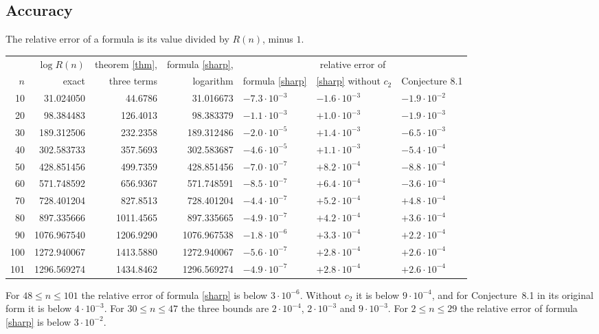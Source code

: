 \documentclass[10pt]{article}
\begin{document}
\subsection*{Accuracy}
The relative error of a formula is its value divided by $R(n)$, minus $1$.
\begin{center}
\small
\begin{tabular}{rrrrlll}
\toprule
 & $\log R(n)$ & theorem \eqref{thm}, & formula \eqref{sharp}, & \multicolumn{3}{c}{relative error of}\\
$n$ & exact & three terms & logarithm & formula \eqref{sharp} & \eqref{sharp} without $c_2$ & Conjecture 8.1\\
\midrule
10 & 31.024050 & 44.6786 & 31.016673 & $-7.3\cdot10^{-3}$ & $-1.6\cdot10^{-3}$ & $-1.9\cdot10^{-2}$\\
20 & 98.384483 & 126.4013 & 98.383379 & $-1.1\cdot10^{-3}$ & $+1.0\cdot10^{-3}$ & $-1.9\cdot10^{-3}$\\
30 & 189.312506 & 232.2358 & 189.312486 & $-2.0\cdot10^{-5}$ & $+1.4\cdot10^{-3}$ & $-6.5\cdot10^{-3}$\\
40 & 302.583733 & 357.5693 & 302.583687 & $-4.6\cdot10^{-5}$ & $+1.1\cdot10^{-3}$ & $-5.4\cdot10^{-4}$\\
50 & 428.851456 & 499.7359 & 428.851456 & $-7.0\cdot10^{-7}$ & $+8.2\cdot10^{-4}$ & $-8.8\cdot10^{-4}$\\
60 & 571.748592 & 656.9367 & 571.748591 & $-8.5\cdot10^{-7}$ & $+6.4\cdot10^{-4}$ & $-3.6\cdot10^{-4}$\\
70 & 728.401204 & 827.8513 & 728.401204 & $-4.4\cdot10^{-7}$ & $+5.2\cdot10^{-4}$ & $+4.8\cdot10^{-4}$\\
80 & 897.335666 & 1011.4565 & 897.335665 & $-4.9\cdot10^{-7}$ & $+4.2\cdot10^{-4}$ & $+3.6\cdot10^{-4}$\\
90 & 1076.967540 & 1206.9290 & 1076.967538 & $-1.8\cdot10^{-6}$ & $+3.3\cdot10^{-4}$ & $+2.2\cdot10^{-4}$\\
100 & 1272.940067 & 1413.5880 & 1272.940067 & $-5.6\cdot10^{-7}$ & $+2.8\cdot10^{-4}$ & $+2.6\cdot10^{-4}$\\
101 & 1296.569274 & 1434.8462 & 1296.569274 & $-4.9\cdot10^{-7}$ & $+2.8\cdot10^{-4}$ & $+2.6\cdot10^{-4}$\\
\bottomrule
\end{tabular}
\end{center}
For $48\le n\le 101$ the relative error of formula \eqref{sharp} is below $3\cdot10^{-6}$. Without $c_2$ it is
below $9\cdot10^{-4}$, and for Conjecture~8.1 in its original form it is below $4\cdot10^{-3}$. For $30\le n\le 47$ the
three bounds are $2\cdot10^{-4}$, $2\cdot10^{-3}$ and $9\cdot10^{-3}$. For $2\le n\le 29$ the relative error of formula
\eqref{sharp} is below $3\cdot10^{-2}$.
\end{document}
